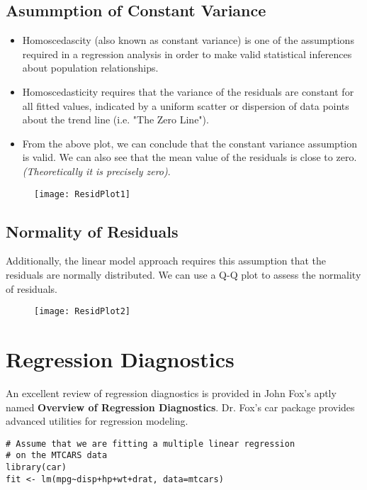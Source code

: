 \documentclass{article}
\begin{document}
\subsection{Asummption of Constant Variance}
\begin{itemize}
\item Homoscedascity (also known as constant variance) is one of the assumptions required in a
regression analysis in order to make valid statistical inferences about population relationships.

\item Homoscedasticity requires that the variance of the residuals are constant for all fitted values,
indicated by a uniform scatter or dispersion of data points about the trend line (i.e. "The Zero Line").
\item From the above plot, we can conclude that the constant variance assumption is valid. We can also
see that the mean value of the residuals is close to zero. \textit{(Theoretically it is precisely zero)}.
\end{itemize}

\begin{figure}
\centering
\texttt{[image: ResidPlot1]}
\end{figure}

\subsection{Normality of Residuals}
Additionally, the linear model approach requires this assumption that the residuals are normally
distributed. We can use a Q-Q plot to assess the normality of residuals.
\begin{figure}
\centering
\texttt{[image: ResidPlot2]}
\end{figure}

\newpage
\section{Regression Diagnostics}

An excellent review of regression diagnostics is provided in John Fox's aptly named \textbf{Overview of Regression Diagnostics}. Dr. Fox's car package provides advanced utilities for regression modeling.
\begin{framed}
	\begin{verbatim}
# Assume that we are fitting a multiple linear regression
# on the MTCARS data
library(car)
fit <- lm(mpg~disp+hp+wt+drat, data=mtcars)
	\end{verbatim}
\end{framed}
\end{document}
